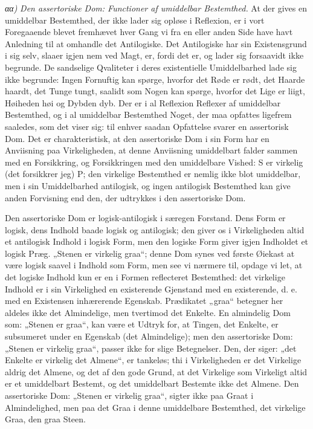 \documentclass[12pt]{book}
\newcommand{\opage}[1]{\marginnote{\footnotesize\textit{[#1]}}}
\begin{document}
\textit{αα)} \emph{Den assertoriske Dom: Functioner af
umiddelbar Bestemthed.} At der gives en umiddelbar
Bestemthed, der ikke lader sig opløse i Reflexion, er i vort
Foregaaende blevet fremhævet hver Gang vi fra en eller anden
Side have havt Anledning til at omhandle det Antilogiske.
Det Antilogiske har sin Existensgrund i sig selv, slaaer igjen%
\opage{181}nem ved Magt, er, fordi det er, og lader sig forsaavidt ikke
begrunde. De sandselige Qvaliteter i deres existentielle Umiddelbarhed
lade sig ikke begrunde: Ingen Fornuftig kan spørge,
hvorfor det Røde er rødt, det Haarde haardt, det Tunge
tungt, saalidt som Nogen kan spørge, hvorfor det Lige er liigt,
Høiheden høi og Dybden dyb. Der er i al Reflexion Reflexer
af umiddelbar Bestemthed, og i al umiddelbar Bestemthed
Noget, der maa opfattes ligefrem saaledes, som det viser
sig: til enhver saadan Opfattelse svarer en assertorisk Dom.
Det er charakteristisk, at den assertoriske Dom i sin Form
har en Anviisning paa Virkeligheden, at denne Anviisning
umiddelbart falder sammen med en Forsikkring, og Forsikkringen
med den umiddelbare Vished: S er virkelig (det forsikkrer jeg)
P; den virkelige Bestemthed er nemlig ikke blot umiddelbar,
men i sin Umiddelbarhed antilogisk, og ingen antilogisk Bestemthed
kan give anden Forvisning end den, der udtrykkes i
den assertoriske Dom.

Den assertoriske Dom er logisk-antilogisk i særegen
Forstand. Dens Form er logisk, dens Indhold baade logisk
og antilogisk; den giver os i Virkeligheden altid et antilogisk
Indhold i logisk Form, men den logiske Form giver igjen
Indholdet et logisk Præg. „Stenen er virkelig graa“; denne
Dom synes ved første Øiekast at være logisk saavel i Indhold
som Form, men see vi nærmere til, opdage vi let, at
det logiske Indhold kun er en i Formen reflecteret Bestemthed:
det virkelige Indhold er i sin Virkelighed en existerende Gjenstand
med en existerende, d. e. med en Existensen inhærerende
Egenskab. Prædikatet „graa“ betegner her aldeles ikke det
Almindelige, men tvertimod det Enkelte. En almindelig Dom
som: „Stenen er graa“, kan være et Udtryk for, at Tingen,
det Enkelte, er subsumeret under en Egenskab (det Almindelige);
men den assertoriske Dom: „Stenen er virkelig graa“, passer
ikke for slige Betegnelser. Den, der siger: „det Enkelte er
virkelig det Almene“, er tankeløs; thi i Virkeligheden er det
\opage{182}Virkelige aldrig det Almene, og det af den gode Grund, at
det Virkelige som Virkeligt altid er et umiddelbart Bestemt,
og det umiddelbart Bestemte ikke det Almene. Den assertoriske
Dom: „Stenen er virkelig graa“, sigter ikke paa Graat i Almindelighed,
men paa det Graa i denne umiddelbare Bestemthed,
det virkelige Graa, den graa Steen.
\end{document}
